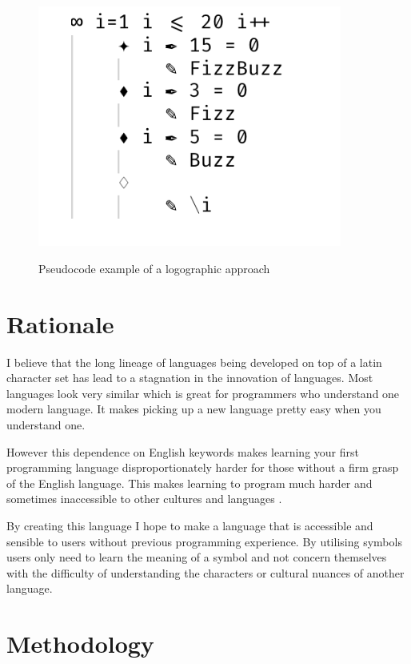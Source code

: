 \documentclass[12pt]{article}
\begin{document}
\begin{figure}[ht]
    \caption{Pseudocode example of a logographic approach}
    \centering
    \includegraphics[width=10cm]{logograph}
    \label{fig:logographic}
\end{figure}

\section{Rationale}

I believe that the long lineage of languages being developed on top of a latin character set
has lead to a stagnation in the innovation of languages. Most languages look very similar which is
great for programmers who understand one modern language. It makes picking up a new language pretty easy
when you understand one.

However this dependence on English keywords makes learning your first programming language disproportionately harder
for those without a firm grasp of the English language. This makes learning to program much harder and sometimes
inaccessible to other cultures and languages \parencite{7026875}. 

By creating this language I hope to make a language that is accessible and sensible to users without previous
programming experience. By utilising symbols users only need to learn the meaning of a symbol and not concern themselves
with the difficulty of understanding the characters or cultural nuances \parencite{Eastman:1982:CEN:358728.358756} of another language.


\section{Methodology}
\end{document}

